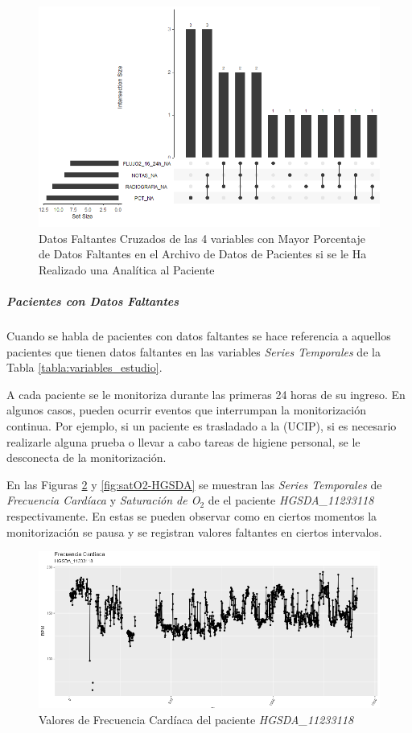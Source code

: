 \begin{figure}[H]
    \centering
    \includegraphics[scale = 0.70]{./img/missig-data-descriptive-cross-anal.png}
    \caption{Datos Faltantes Cruzados de las 4 variables con Mayor Porcentaje de Datos Faltantes en el Archivo de Datos de Pacientes si se le Ha Realizado una Analítica al Paciente}
    \label{fig:missing-descriptive-cross-analitica}
\end{figure}
\newpage


\subparagraph*{Pacientes con Datos Faltantes} 

Cuando se habla de pacientes con datos faltantes se hace referencia a aquellos pacientes que tienen datos faltantes en las variables \textit{Series Temporales} de la Tabla \ref{tabla:variables_estudio}. 

A cada paciente se le monitoriza durante las primeras 24 horas de su ingreso. En algunos casos, pueden ocurrir eventos que interrumpan la monitorización continua. Por ejemplo, si un paciente es trasladado a la (UCIP), si es necesario realizarle alguna prueba o llevar a cabo tareas de higiene personal, se le desconecta de la monitorización. 

En las Figuras \ref{fig:fc-HGSDA} y \ref{fig:satO2-HGSDA} se muestran las \textit{Series Temporales} de \textit{Frecuencia Cardíaca} y \textit{Saturación de O$_2$} de el paciente \textit{HGSDA\_11233118} respectivamente. En estas se pueden observar como en ciertos momentos la monitorización se pausa y se registran valores faltantes en ciertos intervalos. 
\begin{figure}[H]
    \centering
    \includegraphics[scale=0.85]{./img/Heart-Rate-HGSDA.png}
    \caption{Valores de Frecuencia Cardíaca del paciente \textit{HGSDA\_11233118}}
    \label{fig:fc-HGSDA}
\end{figure}

